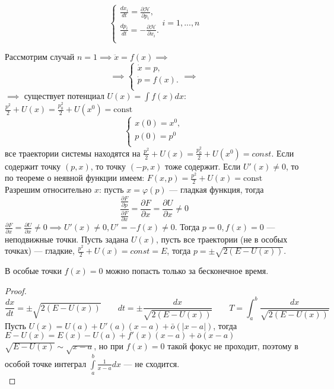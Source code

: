 \begin{example}
\begin{definition}
		$$
			\begin{cases}
				\frac{dx_i}{dt}=\frac{\partial \mathcal H}{\partial p_i}, \\
				\frac{dp_i}{dt}=-\frac{\partial \mathcal H}{\partial x_i}.\\
			\end{cases} i = 1, ..., n
		$$
	\end{definition}
	Рассмотрим случай $n=1 \implies \ddot{x}=f(x) \implies$
	$$
		\implies
		\begin{cases}
		\dot{x}=p, \\
		\dot{p}=f(x).\\
		\end{cases}
	 \implies 
	$$
	$\implies$ существует потенциал $U(x) = \int f(x) dx$: $\frac{p^2}{2} + U(x) = \frac{p_0^2}{2} + U(x^0) = \mbox{const}$
	$$
	\begin{cases}
		x(0)=x^0, \\
		p(0)=p^0\\
	\end{cases}
	$$
	все траектории системы находятся на $\frac{p^2}{2}+U(x)=\frac{p_0^2}{2}+U(x^0)=const$. Если содержит точку $(p,x)$, то точку $(-p,x)$ тоже содержит. Если $U'(x) \ne 0$, то по теореме о неявной функции имеем: $F(x,p)=\frac{p^2}{2}+U(x) = \mbox{const}$\\
	Разрешим относительно $x$: пусть $x=\varphi(p)$ --- гладкая функция, тогда
	$$
		\frac{\frac{\partial F}{\partial p}}{\frac{\partial F}{\partial x}} = \frac{\partial F}{\partial x}=\frac{\partial U}{\partial x} \ne 0
	$$
	$\frac{\partial F}{\partial x} = \frac{\partial U}{\partial x} \ne 0 \implies U'(x) \ne 0,  U' = -f(x) \ne 0$. Тогда $p=0, f(x) = 0$ --- неподвижные точки. Пусть задана $U(x)$, пусть все траектории (не в особых точках) --- гладкие, $\frac{p^2}{2}+U(x)=const=E$, тогда $p=\pm \sqrt{2 (E-U(x))}$.\\

\end{example}

\begin{theorem}
	В особые точки $f(x) = 0$ можно попасть только за бесконечное время.\\
	\begin{proof}
	$$
		\frac{dx}{dt}=\pm \sqrt{2(E-U(x))} \qquad dt=\pm \frac{dx}{\sqrt{2(E-U(x))}} \qquad T=\int_a^b{\frac{dx}{\sqrt{2(E-U(x))}}}
	$$
	Пусть $U(x)=U(a)+U'(a)(x-a)+\bar{o}(|x-a|)$, тогда $ E-U(x)=E(x)-U(a)+f'(x)(x-a)+\bar{o}(x-a)$
	$\sqrt{E-U(x)} \sim \sqrt{x-a}$, но при $f(x) = 0$ такой фокус не проходит, поэтому в особой точке интеграл $\int\limits_a^b \frac{1}{x-a} dx$ --- не сходится.\\
	\end{proof}
\end{theorem}

